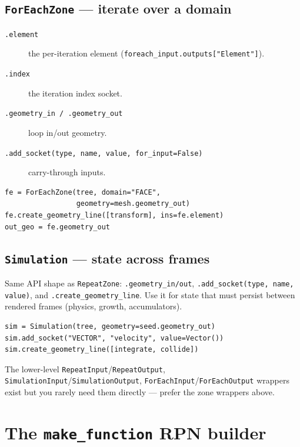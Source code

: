 \documentclass[10pt,a4paper,twocolumn]{article}
\newcommand{\code}[1]{\texttt{\small #1}}
\begin{document}
\subsection{\texttt{ForEachZone} --- iterate over a domain}
\begin{description}
\item[\code{.element}] the per-iteration element
  (\code{foreach\_input.outputs["Element"]}).
\item[\code{.index}] the iteration index socket.
\item[\code{.geometry\_in / .geometry\_out}] loop in/out geometry.
\item[\code{.add\_socket(type, name, value, for\_input=False)}]
  carry-through inputs.
\end{description}

\begin{lstlisting}
fe = ForEachZone(tree, domain="FACE",
                 geometry=mesh.geometry_out)
fe.create_geometry_line([transform], ins=fe.element)
out_geo = fe.geometry_out
\end{lstlisting}

\subsection{\texttt{Simulation} --- state across frames}
Same API shape as \code{RepeatZone}: \code{.geometry\_in/out},
\code{.add\_socket(type, name, value)}, and \code{.create\_geometry\_line}.
Use it for state that must persist between rendered frames (physics,
growth, accumulators).

\begin{lstlisting}
sim = Simulation(tree, geometry=seed.geometry_out)
sim.add_socket("VECTOR", "velocity", value=Vector())
sim.create_geometry_line([integrate, collide])
\end{lstlisting}

The lower-level \code{RepeatInput}/\code{RepeatOutput},
\code{SimulationInput}/\code{SimulationOutput},
\code{ForEachInput}/\code{ForEachOutput} wrappers exist but you rarely
need them directly --- prefer the zone wrappers above.

\section{The \texttt{make\_function} RPN builder}
\end{document}

